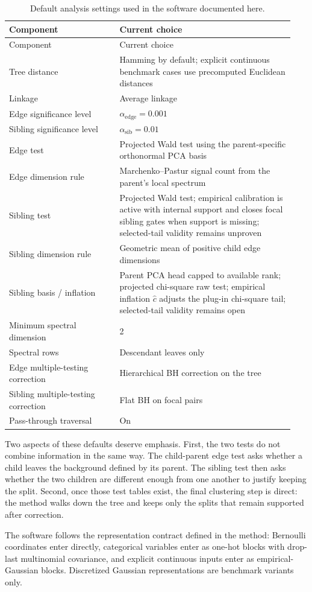 \begin{longtable}{@{}p{0.36\linewidth}p{0.58\linewidth}@{}}
\caption{Default analysis settings used in the software documented here.}
\label{tab:defaults}\\
\toprule
Component & Current choice \\
\midrule
\endfirsthead
\toprule
Component & Current choice \\
\midrule
\endhead
\bottomrule
\endfoot
Tree distance & Hamming by default; explicit continuous benchmark cases use precomputed Euclidean distances \\
Linkage & Average linkage \\
Edge significance level & $\alpha_{\mathrm{edge}} = 0.001$ \\
Sibling significance level & $\alpha_{\mathrm{sib}} = 0.01$ \\
Edge test & Projected Wald test using the parent-specific orthonormal PCA basis \\
Edge dimension rule & Marchenko--Pastur signal count from the parent's local spectrum \\
Sibling test & Projected Wald test; empirical calibration is active with internal support and closes focal sibling gates when support is missing; selected-tail validity remains unproven \\
Sibling dimension rule & Geometric mean of positive child edge dimensions \\
Sibling basis / inflation & Parent PCA head capped to available rank; projected chi-square raw test; empirical inflation $\hat c$ adjusts the plug-in chi-square tail; selected-tail validity remains open \\
Minimum spectral dimension & 2 \\
Spectral rows & Descendant leaves only \\
Edge multiple-testing correction & Hierarchical BH correction on the tree \\
Sibling multiple-testing correction & Flat BH on focal pairs \\
Pass-through traversal & On \\
\end{longtable}

Two aspects of these defaults deserve emphasis. First, the two tests do not
combine information in the same way. The child-parent edge test asks whether a
child leaves the background defined by its parent. The sibling test then asks
whether the two children are different enough from one another to justify
keeping the split. Second, once those test tables exist, the final clustering
step is direct: the method walks down the tree and keeps only the splits that
remain supported after correction.

The software follows the representation contract defined in the method:
Bernoulli coordinates enter directly, categorical variables enter as one-hot
blocks with drop-last multinomial covariance, and explicit continuous inputs
enter as empirical-Gaussian blocks. Discretized Gaussian representations are
benchmark variants only.

